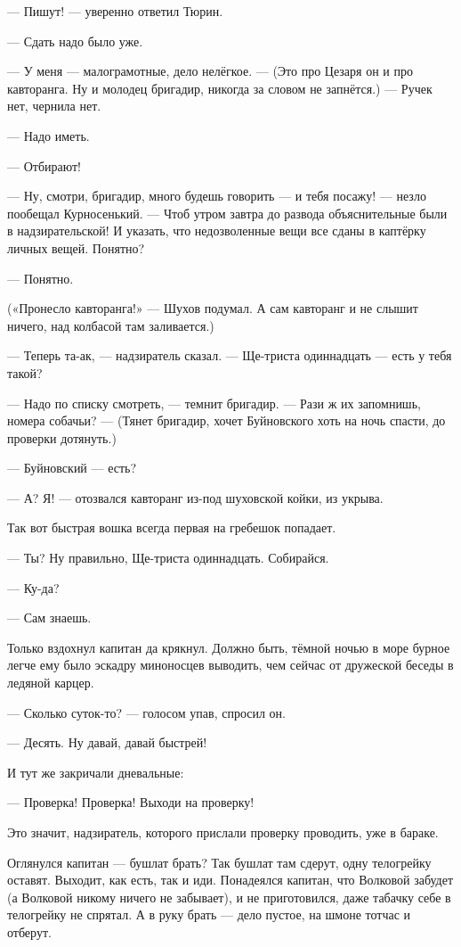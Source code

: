 --- Пишут! --- уверенно ответил Тюрин.

--- Сдать надо было уже.

--- У меня --- малограмотные, дело нелёгкое. --- (Это про Цезаря он и про кавторанга. Ну и молодец 
бригадир, никогда за словом не запнётся.) --- Ручек нет, чернила нет.

--- Надо иметь.

--- Отбирают!

--- Ну, смотри, бригадир, много будешь говорить --- и тебя посажу! --- незло пообещал 
Курносенький. --- Чтоб утром завтра до развода объяснительные были в надзирательской! И 
указать, что недозволенные вещи все сданы в каптёрку личных вещей. Понятно?

--- Понятно.

(«Пронесло кавторанга!» --- Шухов подумал. А сам кавторанг и не слышит ничего, над колбасой там 
заливается.)

--- Теперь та-ак, --- надзиратель сказал. --- Ще-триста одиннадцать --- есть у тебя такой?

--- Надо по списку смотреть, --- темнит бригадир. --- Рази ж их запомнишь, номера собачьи? --- (Тянет 
бригадир, хочет Буйновского хоть на ночь спасти, до проверки дотянуть.)

--- Буйновский --- есть?

--- А? Я! --- отозвался кавторанг из-под шуховской койки, из укрыва.

Так вот быстрая вошка всегда первая на гребешок попадает.

--- Ты? Ну правильно, Ще-триста одиннадцать. Собирайся.

--- Ку-да?

--- Сам знаешь.

Только вздохнул капитан да крякнул. Должно быть, тёмной ночью в море бурное легче ему было 
эскадру миноносцев выводить, чем сейчас от дружеской беседы в ледяной карцер.

--- Сколько суток-то? --- голосом упав, спросил он.

--- Десять. Ну давай, давай быстрей!

И тут же закричали дневальные:

--- Проверка! Проверка! Выходи на проверку!

Это значит, надзиратель, которого прислали проверку проводить, уже в бараке.

Оглянулся капитан --- бушлат брать? Так бушлат там сдерут, одну телогрейку оставят. Выходит, 
как есть, так и иди. Понадеялся капитан, что Волковой забудет (а Волковой никому ничего не 
забывает), и не приготовился, даже табачку себе в телогрейку не спрятал. А в руку брать --- дело 
пустое, на шмоне тотчас и отберут.

